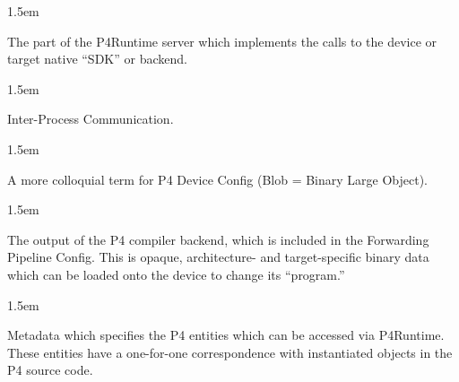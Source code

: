 \documentclass[11pt]{article}
\begin{document}
{\begin{mddefinitions}
\begin{mdbmarginx}{}{}{}{1.5em}%
\begin{mddefdata}%
The part of the P4Runtime server which implements the calls to the device or
target native \textquotedblleft{}SDK\textquotedblright{} or backend.
\end{mddefdata}%
\end{mdbmarginx}%


\begin{mdbmarginx}{}{}{}{1.5em}%
\begin{mddefdata}%
Inter-Process Communication.
\end{mddefdata}%
\end{mdbmarginx}%


\begin{mdbmarginx}{}{}{}{1.5em}%
\begin{mddefdata}%
A more colloquial term for P4 Device Config (Blob = Binary Large Object).
\end{mddefdata}%
\end{mdbmarginx}%


\begin{mdbmarginx}{}{}{}{1.5em}%
\begin{mddefdata}%
The output of the P4 compiler backend, which is included in the Forwarding
Pipeline Config. This is opaque, architecture- and target-specific binary
data which can be loaded onto the device to change its \textquotedblleft{}program.\textquotedblright{}
\end{mddefdata}%
\end{mdbmarginx}%


\begin{mdbmarginx}{}{}{}{1.5em}%
\begin{mddefdata}%
Metadata which specifies the P4 entities which can be accessed via
P4Runtime. These entities have a one-for-one correspondence with
instantiated objects in the P4 source code.
\end{mddefdata}%
\end{mdbmarginx}%


\end{mddefinitions}}
\end{document}
